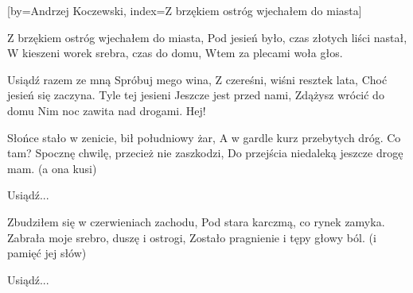 [by={Andrzej Koczewski},
                     index={Z brzękiem ostróg wjechałem do miasta}]
\beginverse

Z brzękiem ostróg wjechałem do miasta,
Pod jesień było, czas złotych liści nastał,
W kieszeni worek srebra, czas do domu,
Wtem za plecami woła głos.

\endverse
\beginverse

Usiądź razem ze mną
Spróbuj mego wina,
Z czereśni, wiśni resztek lata,
Choć jesień się zaczyna.
Tyle tej jesieni
Jeszcze jest przed nami,
Zdążysz wrócić do domu
Nim noc zawita nad drogami. Hej!

\endverse
\beginverse

Słońce stało w zenicie, bił południowy żar,
A w gardle kurz przebytych dróg.
Co tam? Spocznę chwilę, przecież nie zaszkodzi,
Do przejścia niedaleką jeszcze drogę mam.
(a ona kusi)

\endverse
\beginverse

Usiądź...

\endverse
\beginverse

Zbudziłem się w czerwieniach zachodu,
Pod stara karczmą, co rynek zamyka.
Zabrała moje srebro, duszę i ostrogi,
Zostało pragnienie i tępy głowy ból.
(i pamięć jej słów)

\endverse
\beginverse

Usiądź...

\endverse
\endsong